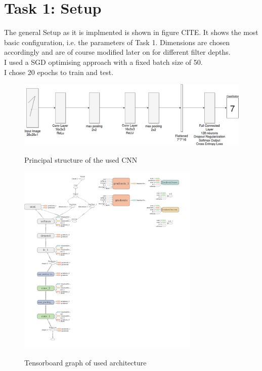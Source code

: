 \documentclass[paper=a4, fontsize=11pt]{scrartcl} %
\numberwithin{equation}{section} %
\numberwithin{figure}{section} %
\numberwithin{table}{section} %
\begin{document}

\section{Task 1: Setup}

The general Setup as it is implmented is shown in figure CITE. It shows the most basic configuration, i.e. the parameters of Task 1. Dimensions are chosen accordingly and are of course modified later on for different filter depths.\\
I used a SGD optimising approach with a fixed batch size of 50.\\
I chose 20 epochs to train and test.
\begin{figure}[hbpt!]
	\includegraphics[width=\textwidth]{setup}
	\label{fig:setup}
	\caption{Principal structure of the used CNN}
\end{figure}
\begin{figure}[hbpt!]
	\includegraphics[width=\textwidth,height=9.2cm]{cnn_structure_tb}
	\label{fig:setup}
	\caption{Tensorboard graph of used architecture}
\end{figure}
\vfill


%	
%
%
%
%
%
%
\clearpage
\end{document}
